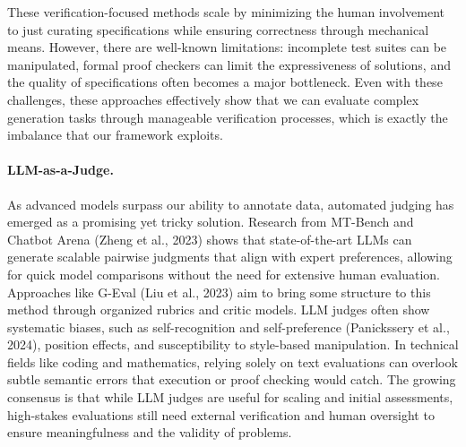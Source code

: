 \documentclass{article} %
\begin{document}
These verification-focused methods scale by minimizing the human involvement to just curating specifications while ensuring correctness through mechanical means.  However, there are well-known limitations: incomplete test suites can be manipulated, formal proof checkers can limit the expressiveness of solutions, and the quality of specifications often becomes a major bottleneck. Even with these challenges, these approaches effectively show that we can evaluate complex generation tasks through manageable verification processes, which is exactly the imbalance that our framework exploits.


\paragraph{LLM-as-a-Judge.}
As advanced models surpass our ability to annotate data, automated judging has emerged as a promising yet tricky solution. Research from MT-Bench and Chatbot Arena (Zheng et al., 2023) shows that state-of-the-art LLMs can generate scalable pairwise judgments that align with expert preferences, allowing for quick model comparisons without the need for extensive human evaluation. Approaches like G-Eval (Liu et al., 2023) aim to bring some structure to this method through organized rubrics and critic models. LLM judges often show systematic biases, such as self-recognition and self-preference (Panickssery et al., 2024), position effects, and susceptibility to style-based manipulation. In technical fields like coding and mathematics, relying solely on text evaluations can overlook subtle semantic errors that execution or proof checking would catch. The growing consensus is that while LLM judges are useful for scaling and initial assessments, high-stakes evaluations still need external verification and human oversight to ensure meaningfulness and the validity of problems.
\end{document}
